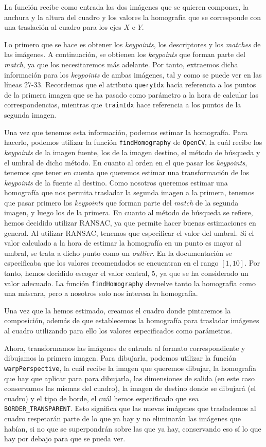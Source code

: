 \documentclass[11pt,a4paper]{article}
\begin{document}
La función recibe como entrada las dos imágenes que se quieren componer, la anchura
y la altura del cuadro y los valores la homografía que se corresponde con una traslación
al cuadro para los ejes $X$ e $Y$.

Lo primero que se hace es obtener los \textit{keypoints}, los descriptores y los
\textit{matches} de las imágenes. A continuación, se obtienen los \textit{keypoints}
que forman parte del \textit{match}, ya que los necesitaremos más adelante. Por tanto,
extraemos dicha información para los \textit{keypoints} de ambas imágenes, tal y como
se puede ver en las líneas 27-33. Recordemos que el atributo \texttt{queryIdx} hacía referencia
a los puntos de la primera imagen que se ha pasado como parámetro a la hora de calcular
las correspondencias, mientras que \texttt{trainIdx} hace referencia a los puntos de la
segunda imagen.

Una vez que tenemos esta información, podemos estimar la homografía. Para hacerlo,
podemos utilizar la función \texttt{findHomography} de \texttt{OpenCV}, la cuál recibe
los \textit{keypoints} de la imagen fuente, los de la imagen destino, el método de búsqueda
y el umbral de dicho método. En cuanto al orden en el que pasar los \textit{keypoints}, tenemos
que tener en cuenta que queremos estimar una transformación de los \textit{keypoints} de
la fuente al destino. Como nosotros queremos estimar una homografía que nos permita
trasladar la segunda imagen a la primera, tenemos que pasar primero los \textit{keypoints}
que forman parte del \textit{match} de la segunda imagen, y luego los de la primera. En
cuanto al método de búsqueda se refiere, hemos decidido utilizar RANSAC, ya que permite
hacer buenas estimaciones en general. Al utilizar RANSAC, tenemos que especificar el valor
del umbral. Si el valor calculado a la hora de estimar la homografía en un punto es mayor al
umbral, se trata a dicho punto como un \textit{outlier}. En la documentación se especificaba
que los valores recomendados se encuentran en el rango $[1, 10]$. Por tanto, hemos decidido
escoger el valor central, 5, ya que se ha considerado un valor adecuado. La función \texttt{findHomography}
devuelve tanto la homografía como una máscara, pero a nosotros solo nos interesa la homografía.

Una vez que la hemos estimado, creamos el cuadro donde pintaremos la composición, además
de que establecemos la homografía para trasladar imágenes al cuadro utilizando para ello
los valores especificados como parámetros.

Ahora, transformamos las imágenes de entrada al formato correspondiente y dibujamos
la primera imagen. Para dibujarla, podemos utilizar la función \texttt{warpPerspective},
la cuál recibe la imagen que queremos dibujar, la homografía que hay que aplicar
para para dibujarla, las dimensiones de salida (en este caso conservamos las mismas
del cuadro), la imagen de destino donde se dibujará (el cuadro) y el tipo de borde,
el cuál hemos especificado que sea \texttt{BORDER\_TRANSPARENT}. Esto significa
que las nuevas imágenes que traslademos al cuadro respetarán parte de lo que ya hay
y no eliminarán las imágenes que habían, si no que se superpondrán sobre las que
ya hay, conservando eso sí lo que hay por debajo para que se pueda ver.
\end{document}
